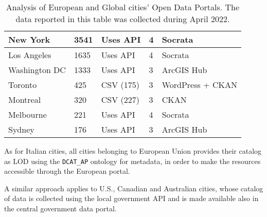 \begin{table}[!ht]
\begin{tabular}{|lllll|}
    \multicolumn{1}{|l|}{New York}                    & \multicolumn{1}{|l|}{3541}                                             & \multicolumn{1}{|l|}{Uses \acs{API}}                                                  & \multicolumn{1}{|l|}{4}        & \multicolumn{1}{|l|}{Socrata}                                   \\ \hline
    \multicolumn{1}{|l|}{Los Angeles}                 & \multicolumn{1}{|l|}{1635}                                             & \multicolumn{1}{|l|}{Uses \acs{API}}                                                  & \multicolumn{1}{|l|}{4}        & \multicolumn{1}{|l|}{Socrata}                                   \\ \hline
    \multicolumn{1}{|l|}{Washington DC}               & \multicolumn{1}{|l|}{1333}                                             & \multicolumn{1}{|l|}{Uses \acs{API}}                                                  & \multicolumn{1}{|l|}{3}        & \multicolumn{1}{|l|}{ArcGIS Hub}                                   \\ \hline
    \multicolumn{1}{|l|}{Toronto}                     & \multicolumn{1}{|l|}{425}                                              & \multicolumn{1}{|l|}{CSV (175)}                                                       & \multicolumn{1}{|l|}{3}        & \multicolumn{1}{|l|}{WordPress + CKAN}                                   \\ \hline
    \multicolumn{1}{|l|}{Montreal}                    & \multicolumn{1}{|l|}{320}                                              & \multicolumn{1}{|l|}{CSV (227)}                                                       & \multicolumn{1}{|l|}{3}        & \multicolumn{1}{|l|}{CKAN}                                   \\ \hline
    \multicolumn{1}{|l|}{Melbourne}                   & \multicolumn{1}{|l|}{221}                                              & \multicolumn{1}{|l|}{Uses \acs{API}}                                                  & \multicolumn{1}{|l|}{4}        & \multicolumn{1}{|l|}{Socrata}                                   \\ \hline
    \multicolumn{1}{|l|}{Sydney}                      & \multicolumn{1}{|l|}{176}                                              & \multicolumn{1}{|l|}{Uses \acs{API}}                                                  & \multicolumn{1}{|l|}{3}        & \multicolumn{1}{|l|}{ArcGIS Hub}                                   \\ \hline
  \end{tabular}
  \caption{Analysis of European and Global cities' Open Data Portals. The data reported in this table was collected during April 2022.}
  \label{tab:other-cities}
\end{table}

As for Italian cities, all cities belonging to European Union provides their catalog as \acl{LOD} using the \verb#DCAT_AP# ontology for metadata, in order to make the resources accessible through the European portal.

A similar approach applies to U.S., Canadian and Australian cities, whose catalog of data is collected using the local government \acs{API} and is made available also in the central government data portal.